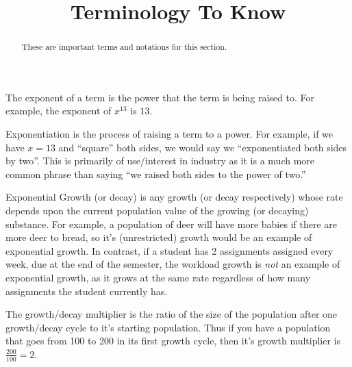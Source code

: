 \documentclass{ximera}
\title{Terminology To Know}
\begin{document}
\begin{abstract}
These are important terms and notations for this section.
\end{abstract}
\maketitle

\begin{definition}[Exponent]
    The exponent of a term is the power that the term is being raised to. For example, the exponent of $x^13$ is $13$.
\end{definition}

\begin{definition}[Exponentiation]
    Exponentiation is the process of raising a term to a power. For example, if we have $x = 13$ and ``square'' both sides, we would say we ``exponentiated both sides by two''. This is primarily of use/interest in industry as it is a much more common phrase than saying ``we raised both sides to the power of two.''
\end{definition}

\begin{definition}
    Exponential Growth (or decay) is any growth (or decay respectively) whose rate depends upon the current population value of the growing (or decaying) substance. For example, a population of deer will have more babies if there are more deer to bread, so it's (unrestricted) growth would be an example of exponential growth. In contrast, if a student has 2 assignments assigned every week, due at the end of the semester, the workload growth is \textit{not} an example of exponential growth, as it grows at the same rate regardless of how many assignments the student currently has. 
\end{definition}

\begin{definition}
    The growth/decay multiplier is the ratio of the size of the population after one growth/decay cycle to it's starting population. Thus if you have a population that goes from 100 to 200 in its first growth cycle, then it's growth multiplier is $\frac{200}{100} = 2$.
\end{definition}
\end{document}
